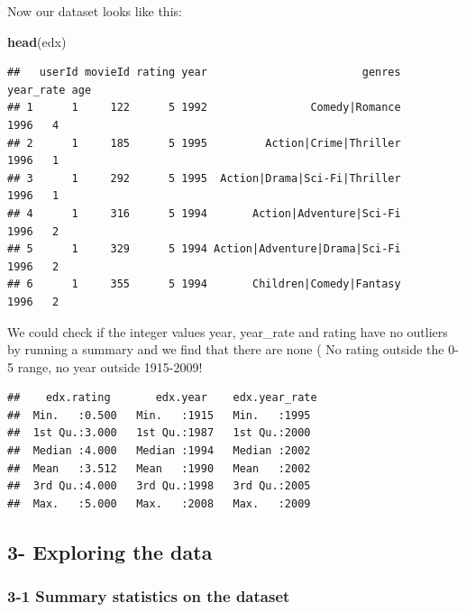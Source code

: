 \documentclass[]{article}
\newenvironment{Shaded}{\begin{snugshade}}{\end{snugshade}}
\newcommand{\KeywordTok}[1]{\textcolor[rgb]{0.13,0.29,0.53}{\textbf{#1}}}
\newcommand{\StringTok}[1]{\textcolor[rgb]{0.31,0.60,0.02}{#1}}
\newcommand{\OperatorTok}[1]{\textcolor[rgb]{0.81,0.36,0.00}{\textbf{#1}}}
\newcommand{\NormalTok}[1]{#1}
\begin{document}
Now our dataset looks like this:

\begin{Shaded}
\begin{Highlighting}[]
\KeywordTok{head}\NormalTok{(edx)}
\end{Highlighting}
\end{Shaded}

\begin{verbatim}
##   userId movieId rating year                        genres year_rate age
## 1      1     122      5 1992                Comedy|Romance      1996   4
## 2      1     185      5 1995         Action|Crime|Thriller      1996   1
## 3      1     292      5 1995  Action|Drama|Sci-Fi|Thriller      1996   1
## 4      1     316      5 1994       Action|Adventure|Sci-Fi      1996   2
## 5      1     329      5 1994 Action|Adventure|Drama|Sci-Fi      1996   2
## 6      1     355      5 1994       Children|Comedy|Fantasy      1996   2
\end{verbatim}

We could check if the integer values year, year\_rate and rating have no
outliers by running a summary and we find that there are none ( No
rating outside the 0-5 range, no year outside 1915-2009!

\begin{Shaded}
\end{Shaded}

\begin{verbatim}
##    edx.rating       edx.year    edx.year_rate 
##  Min.   :0.500   Min.   :1915   Min.   :1995  
##  1st Qu.:3.000   1st Qu.:1987   1st Qu.:2000  
##  Median :4.000   Median :1994   Median :2002  
##  Mean   :3.512   Mean   :1990   Mean   :2002  
##  3rd Qu.:4.000   3rd Qu.:1998   3rd Qu.:2005  
##  Max.   :5.000   Max.   :2008   Max.   :2009
\end{verbatim}

\subsection{3- Exploring the data}\label{exploring-the-data}

\subsubsection{3-1 Summary statistics on the
dataset}\label{summary-statistics-on-the-dataset}
\end{document}
